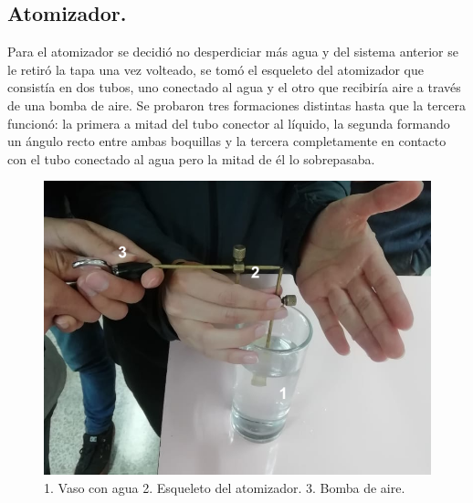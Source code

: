 \documentclass[10pt,a4paper]{article}
\begin{document}
\subsection*{Atomizador.}
Para el atomizador se decidió no desperdiciar más agua y del sistema anterior se le retiró la tapa una vez volteado, se tomó el esqueleto del atomizador que consistía en dos tubos, uno conectado al agua y el otro que recibiría aire a través de una bomba de aire. Se probaron tres formaciones distintas hasta que la tercera funcionó: la primera a mitad del tubo conector al líquido, la segunda formando un ángulo recto entre ambas boquillas y la tercera completamente en contacto con el tubo conectado al agua pero la mitad de él lo sobrepasaba.
\begin{figure}[H]
\includegraphics[scale=0.22]{atomizador1.png}
\centering
\caption{1. Vaso con agua 2. Esqueleto del atomizador. 3. Bomba de aire.}
\end{figure}
\end{document}
